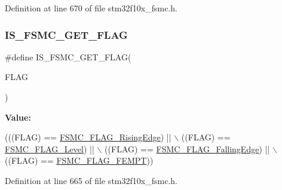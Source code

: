 Definition at line 670 of file stm32f10x\+\_\+fsmc.\+h.

\mbox{\label{group___f_s_m_c___flags_gab8674160ef7884f939e07041bbf5b18b}} 
\subsubsection{\texorpdfstring{I\+S\+\_\+\+F\+S\+M\+C\+\_\+\+G\+E\+T\+\_\+\+F\+L\+AG}{IS\_FSMC\_GET\_FLAG}}
{\footnotesize\ttfamily \#define I\+S\+\_\+\+F\+S\+M\+C\+\_\+\+G\+E\+T\+\_\+\+F\+L\+AG(\begin{DoxyParamCaption}\item[{}]{F\+L\+AG }\end{DoxyParamCaption})}

{\bfseries Value\+:}
\begin{DoxyCode}
(((FLAG) == \hyperlink{group___f_s_m_c___flags_ga5aadbd5d9f1b6a25bcc1fc6f3bf4c9cc}{FSMC\_FLAG\_RisingEdge}) || \(\backslash\)
                                ((FLAG) == \hyperlink{group___f_s_m_c___flags_ga25868d35780998a52190c424ebb3823f}{FSMC\_FLAG\_Level}) || \(\backslash\)
                                ((FLAG) == \hyperlink{group___f_s_m_c___flags_gaaaa85bce06ed962874686ad7af0f0cb7}{FSMC\_FLAG\_FallingEdge}) || \(\backslash\)
                                ((FLAG) == \hyperlink{group___f_s_m_c___flags_ga8da2bd0b9d11877aaebaba0c77e8b0cc}{FSMC\_FLAG\_FEMPT}))
\end{DoxyCode}


Definition at line 665 of file stm32f10x\+\_\+fsmc.\+h.

